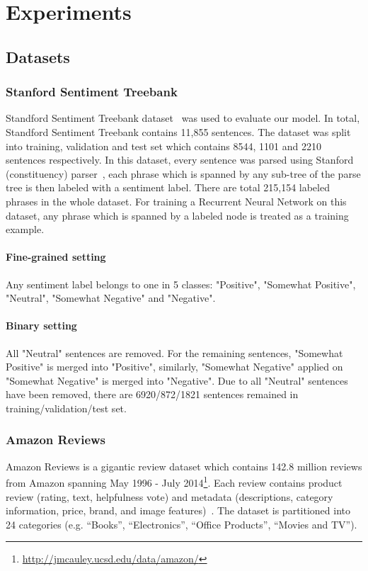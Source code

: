 \section{Experiments}
\subsection{Datasets}
\subsubsection{Stanford Sentiment Treebank} \label{sec:sst}
Standford Sentiment Treebank dataset~\cite{socher2013recursive} was used to evaluate our model.
In total, Standford Sentiment Treebank contains 11,855 sentences.
The dataset was split into training, validation and test set which contains 8544, 1101 and 2210 sentences respectively.
In this dataset, every sentence was parsed using Stanford (constituency) parser~\cite{socher2013recursive}, each phrase which is spanned by any sub-tree of the parse tree is then labeled with  a sentiment label.
There are total 215,154 labeled phrases in the whole dataset.
For training a Recurrent Neural Network on this dataset, any phrase which is spanned by a labeled node is treated as a training example. 
\paragraph{Fine-grained setting} Any sentiment label belongs to one in 5 classes: "Positive", "Somewhat Positive", "Neutral", "Somewhat Negative" and "Negative".
\paragraph{Binary setting} All "Neutral" sentences are removed.
For the remaining sentences, "Somewhat Positive" is merged into "Positive", similarly, "Somewhat Negative" applied on "Somewhat Negative" is merged into "Negative".
Due to all "Neutral" sentences have been removed, there are 6920/872/1821 sentences remained in training/validation/test set.
\subsubsection{Amazon Reviews}\label{sec:amazon}
Amazon Reviews is a gigantic review dataset
which contains 142.8 million reviews from Amazon spanning May 1996 - July 2014\footnote{\url{http://jmcauley.ucsd.edu/data/amazon/}}.
Each review contains product review (rating, text, helpfulness vote) and metadata (descriptions, category information, price, brand, and image features)~\cite{amazon-reviews}.
The dataset is partitioned into 24 categories (e.g. ``Books'', ``Electronics'', ``Office Products'', ``Movies and TV'').

